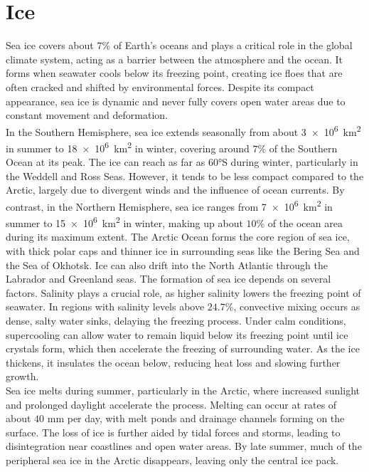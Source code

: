 \section{Ice}
Sea ice covers about $7$\% of Earth's oceans and plays a critical role in the global climate system, acting as a barrier between the atmosphere and the ocean. It forms when seawater cools below its freezing point, creating ice floes that are often cracked and shifted by environmental forces. Despite its compact appearance, sea ice is dynamic and never fully covers open water areas due to constant movement and deformation. \\
In the Southern Hemisphere, sea ice extends seasonally from about \qty{3e6}{\kilo\meter\squared} in summer to \qty{18e6}{\kilo\meter\squared} in winter, covering around $7$\% of the Southern Ocean at its peak. The ice can reach as far as \ang{60}S during winter, particularly in the Weddell and Ross Seas. However, it tends to be less compact compared to the Arctic, largely due to divergent winds and the influence of ocean currents. By contrast, in the Northern Hemisphere, sea ice ranges from \qty{7e6}{\kilo\meter\squared} in summer to \qty{15e6}{\kilo\meter\squared} in winter, making up about $10$\% of the ocean area during its maximum extent. The Arctic Ocean forms the core region of sea ice, with thick polar caps and thinner ice in surrounding seas like the Bering Sea and the Sea of Okhotsk. Ice can also drift into the North Atlantic through the Labrador and Greenland seas.
The formation of sea ice depends on several factors. Salinity plays a crucial role, as higher salinity lowers the freezing point of seawater. In regions with salinity levels above $24.7$\%, convective mixing occurs as dense, salty water sinks, delaying the freezing process. Under calm conditions, supercooling can allow water to remain liquid below its freezing point until ice crystals form, which then accelerate the freezing of surrounding water. As the ice thickens, it insulates the ocean below, reducing heat loss and slowing further growth. \\
Sea ice melts during summer, particularly in the Arctic, where increased sunlight and prolonged daylight accelerate the process. Melting can occur at rates of about $40$ mm per day, with melt ponds and drainage channels forming on the surface. The loss of ice is further aided by tidal forces and storms, leading to disintegration near coastlines and open water areas. By late summer, much of the peripheral sea ice in the Arctic disappears, leaving only the central ice pack. \\
